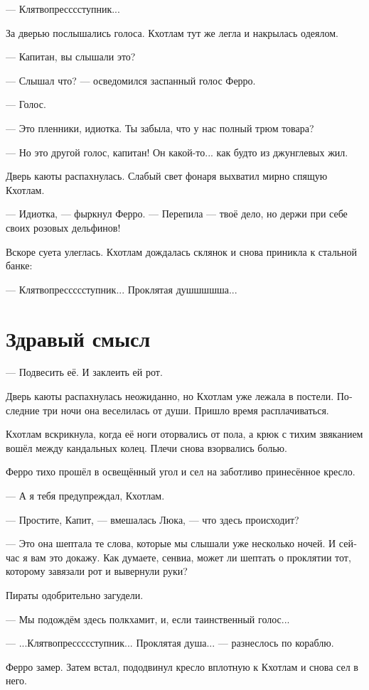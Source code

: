 \documentclass[a4paper,12pt,fleqn]{book}\usepackage{cooltooltips}\usepackage{polyglossia}\setdefaultlanguage{russian}\setotherlanguage{english}\defaultfontfeatures{Ligatures=TeX,Mapping=tex-text} \usepackage{xcolor}\definecolor{lightgray}{HTML}{bbbbbb}\color{lightgray}\newcommand{\ml}[3]{\textenglish{\textcolor{black}{#3}}}
\begin{document}
--- Клятвопресссступник...

За дверью послышались голоса.
Кхотлам тут же легла и накрылась одеялом.

--- Капитан, вы слышали это?

--- Слышал что? --- осведомился заспанный голос Ферро.

--- Голос.

--- Это пленники, идиотка.
Ты забыла, что у нас полный трюм товара?

--- Но это другой голос, капитан!
Он какой-то... как будто из джунглевых жил.

Дверь каюты распахнулась.
Слабый свет фонаря выхватил мирно спящую Кхотлам.

--- Идиотка, --- фыркнул Ферро.
--- Перепила --- твоё дело, но держи при себе своих розовых дельфинов!

Вскоре суета улеглась.
Кхотлам дождалась склянок и снова приникла к стальной банке:

--- Клятвопрессссступник...
Проклятая душшшшша...

\section{Здравый смысл}

--- Подвесить её.
И заклеить ей рот.

Дверь каюты распахнулась неожиданно, но Кхотлам уже лежала в постели.
Последние три ночи она веселилась от души.
Пришло время расплачиваться.

Кхотлам вскрикнула, когда её ноги оторвались от пола, а крюк с тихим звяканием вошёл между кандальных колец.
Плечи снова взорвались болью.

Ферро тихо прошёл в освещённый угол и сел на заботливо принесённое кресло.

--- А я тебя предупреждал, Кхотлам.

--- Простите, Капит, --- вмешалась Люка, --- что здесь происходит?

--- Это она шептала те слова, которые мы слышали уже несколько ночей.
И сейчас я вам это докажу.
Как думаете, сенвиа, может ли шептать о проклятии тот, которому завязали рот и вывернули руки?

Пираты одобрительно загудели.

--- Мы подождём здесь полкхамит, и, если таинственный голос...

--- ...Клятвопрессссступник... Проклятая душа... --- разнеслось по кораблю.

Ферро замер.
Затем встал, пододвинул кресло вплотную к Кхотлам и снова сел в него.
\end{document}
